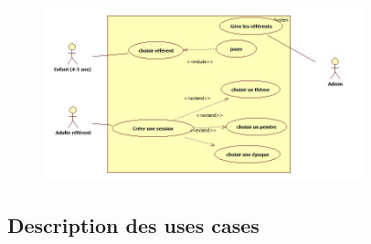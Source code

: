 \documentclass[12pt,a4paper]{report}
\begin{document}
\begin{figure}[!h]
\centering
\includegraphics[width=350px]{uml.jpg}
\end{figure}

\subsection{Description des uses cases}
\end{document}
